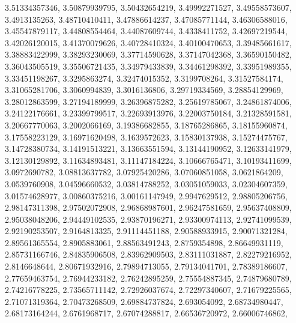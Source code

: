 \begin{code}
\begin{hide}
{     3.51334357346,     3.50879939795,     3.50432654219,
     3.49992271527,     3.49558573607,      3.4913135263,
     3.48710410411,     3.47886614237,     3.47085771144,
     3.46306588016,     3.45547879117,     3.44808554464,
     3.44087609744,      3.4338411752,     3.42697219544,
     3.42026120015,     3.41370079626,     3.40728410324,
     3.40100470653,     3.39485661617,     3.38883422999,
     3.38293230069,     3.37714590628,     3.37147042368,
     3.36590150482,     3.36043505519,     3.35506721435,
     3.34979433839,     3.34461298392,     3.33951989355,
     3.33451198267,      3.3295863274,     3.32474015352,
      3.3199708264,     3.31527584174,     3.31065281706,
      3.3060994839,      3.3016136806,     3.29719334569,
     3.28854129969,     3.28012863599,     3.27194189999,
     3.26396875282,     3.25619785067,     3.24861874006,
     3.24122176661,     3.23399799517,     3.22693913976,
     3.22003750184,     3.21328591581,     3.20667770063,
      3.2002066169,     3.19386682855,     3.18765286865,
     3.18155960874,     3.17558223129,     3.16971620498,
      3.1639572623,     3.15830137938,     3.15274475767,
     3.14728380734,     3.14191513221,     3.13663551594,
     3.13144190952,     3.12633141979,     3.12130129892,
     3.11634893481,     3.11147184224,     3.10666765471,
     3.10193411699,      3.0972690782,     3.08813637782,
     3.07925420286,     3.07060851058,      3.0621864209,
      3.0539760908,     3.04596660532,     3.03814788252,
     3.03051059033,     3.02304607359,     3.01574628977,
     3.00860375216,     3.00161147949,      2.9947629512,
     2.98805206756,     2.98147311398,     2.97502072908,
     2.96868987601,     2.96247581659,     2.95637408809,
     2.95038048206,     2.94449102535,     2.93870196271,
     2.93300974113,     2.92741099539,     2.92190253507,
      2.9164813325,     2.91114451188,     2.90588933915,
     2.90071321284,     2.89561365554,      2.8905883061,
     2.88563491243,      2.8759354898,     2.86649931119,
     2.85731166746,     2.84835906508,     2.83962909503,
     2.83111031887,     2.82279216952,      2.8146648644,
     2.80671932916,     2.79894713055,     2.79134041701,
     2.78389186607,     2.77659463754,     2.76944233182,
     2.76242895259,     2.75554887345,     2.74879680789,
     2.74216778225,     2.73565711142,     2.72926037674,
     2.72297340607,     2.71679225565,     2.71071319364,
     2.70473268509,     2.69884737824,       2.693054092,
     2.68734980447,     2.68173164244,      2.6761968717,
     2.67074288817,     2.66536720972,     2.66006746862,
}
\end{hide}
\end{code}
